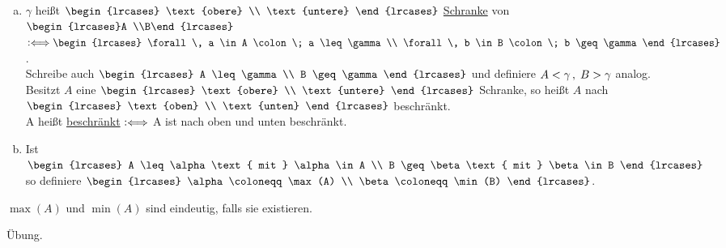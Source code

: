 \documentclass[../ana1.tex]{subfiles}
\begin{document}
\begin{defi*}\leavevmode
	\begin{enumerate}[(a)]
		\item \(\gamma \) heißt \(\begin{lrcases}
									\text{obere} \\
									\text{untere}
								 \end{lrcases} \) \underline{Schranke} von \(\begin{lrcases}A \\B\end{lrcases} \)
			  \(\longeq \begin{lrcases}
							\forall \, a \in A \colon \; a \leq \gamma \\
							\forall \, b \in B \colon \; b \geq \gamma  
						\end{lrcases} \). \\
			  Schreibe auch \(\begin{lrcases}
								 A \leq \gamma \\ 
								 B \geq \gamma 
							  \end{lrcases} \)
			  und definiere \(A < \gamma \operatorname{,}  \; B > \gamma \) analog. \\
			  Besitzt \(A \) eine \(\begin{lrcases}
									  \text{obere} \\
									  \text{untere}
								   \end{lrcases} \) Schranke,
			  so heißt \(A \) nach \(\begin{lrcases}
									  \text{oben} \\
									  \text{unten}
								   \end{lrcases} \) beschränkt. \\
			  A heißt \underline{beschränkt} \(\mathrel{\vcentcolon\Longleftrightarrow} \) A ist nach oben und unten beschränkt.
		\item Ist \(\begin{lrcases}
						A \leq \alpha \text{ mit } \alpha \in A \\
						B \geq \beta \text{ mit } \beta \in B
					\end{lrcases} \) so definiere
			  \(\begin{lrcases}
					\alpha \coloneqq \max(A) \\
					\beta \coloneqq \min(B)
				\end{lrcases} \).
	\end{enumerate}
\end{defi*}

\begin{bem}
	\(\max(A) \) und \(\min(A) \) sind eindeutig, falls sie existieren.
\end{bem}
\begin{bew}
	Übung.\phantom{\qedhere}
\end{bew}
\end{document}
